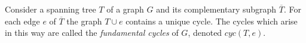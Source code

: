 Consider a spanning tree $T$ of a graph $G$
and its complementary subgraph $\overline{T}$.
For each edge $e$ of $\overline{T}$ the graph $T\cup e$
contains a unique cycle. The cycles which arise in this way are called
the {\it fundamental cycles} of $G$, denoted $cyc(T,e)$.




